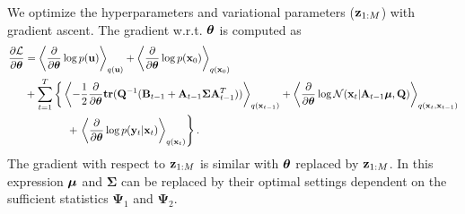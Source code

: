 \documentclass{article} %
\newcommand{\n}[1]{\mathbf{#1}}
\newcommand{\x}{\mathbf{x}}
\newcommand{\bSigma}{\boldsymbol\Sigma}
\begin{document}
We optimize the hyperparameters and variational parameters (${\bf z}_{1:M}$) with gradient ascent. The gradient w.r.t. $\boldsymbol{\theta}$ is computed as
\begin{align}
\frac{\partial \mathcal{L}}{\partial \bta} &= \left\langle\frac{\partial}{\partial \bta} \log p(\bu)\right\rangle_{q(\bu)} + \left\langle\frac{\partial}{\partial \bta} \log p(\bx_0)\right\rangle_{q(\bx_0)} \nn\\
& + \sum_{t=1}^T \bigg\{\left\langle -\frac{1}{2}\frac{\partial}{\partial \bta} \tr(\n{Q}^{-1} ({\n{B}_{t-1}} + {\n{A}_{t-1}} \bSigma {\n{A}}^T_{t-1}) ) \right\rangle_{q(\bx_{t-1})}
+ \left\langle \frac{\partial}{\partial \bta} \log \mathcal{N}(\x_t |\n{A}_{t-1} \bmu, \n{Q})\right\rangle_{q(\bx_t,\bx_{t-1})} \nn\\
&\qquad \qquad + \left. \left\langle \frac{\partial}{\partial \bta}\log p(\by_t | \x_t) \right\rangle_{q(\bx_t)} \right\}.
\end{align}
The gradient with respect to ${\bf z}_{1:M}$ is similar with $\boldsymbol{\theta}$ replaced by ${\bf z}_{1:M}$. In this expression $\boldsymbol{\mu}$ and $\bSigma$ can be replaced by their optimal settings dependent on the sufficient statistics $\boldsymbol\Psi_1$ and $\boldsymbol\Psi_2$.


\end{document}
